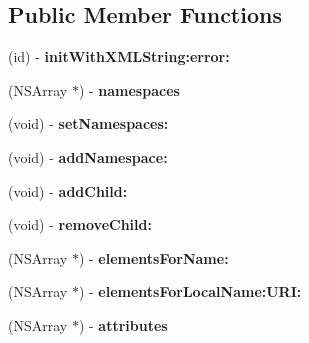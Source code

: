 \subsection*{Public Member Functions}
\begin{DoxyCompactItemize}
\item 
\hypertarget{interface_g_data_x_m_l_element_a8020a4dae6ad3175527534d5a793e285}{
(id) -\/ {\bfseries initWithXMLString:error:}}
\label{interface_g_data_x_m_l_element_a8020a4dae6ad3175527534d5a793e285}

\item 
\hypertarget{interface_g_data_x_m_l_element_a4c0f13082cdf1115dd51a1199a6c8935}{
(NSArray $\ast$) -\/ {\bfseries namespaces}}
\label{interface_g_data_x_m_l_element_a4c0f13082cdf1115dd51a1199a6c8935}

\item 
\hypertarget{interface_g_data_x_m_l_element_af725206ae3ce5c7855a1a2960e82fef7}{
(void) -\/ {\bfseries setNamespaces:}}
\label{interface_g_data_x_m_l_element_af725206ae3ce5c7855a1a2960e82fef7}

\item 
\hypertarget{interface_g_data_x_m_l_element_a58f2f9b4dbc512caa8b0a6ac42e907a1}{
(void) -\/ {\bfseries addNamespace:}}
\label{interface_g_data_x_m_l_element_a58f2f9b4dbc512caa8b0a6ac42e907a1}

\item 
\hypertarget{interface_g_data_x_m_l_element_a506a65646d411876d1d23b1ce0afa920}{
(void) -\/ {\bfseries addChild:}}
\label{interface_g_data_x_m_l_element_a506a65646d411876d1d23b1ce0afa920}

\item 
\hypertarget{interface_g_data_x_m_l_element_a8d9571efd0923ecc365b267fd1c95c8a}{
(void) -\/ {\bfseries removeChild:}}
\label{interface_g_data_x_m_l_element_a8d9571efd0923ecc365b267fd1c95c8a}

\item 
\hypertarget{interface_g_data_x_m_l_element_af0724908d7e1c6b831caddcaf7973aaa}{
(NSArray $\ast$) -\/ {\bfseries elementsForName:}}
\label{interface_g_data_x_m_l_element_af0724908d7e1c6b831caddcaf7973aaa}

\item 
\hypertarget{interface_g_data_x_m_l_element_af2cb81abe782d2d3396fe9abe3b9f60e}{
(NSArray $\ast$) -\/ {\bfseries elementsForLocalName:URI:}}
\label{interface_g_data_x_m_l_element_af2cb81abe782d2d3396fe9abe3b9f60e}

\item 
\hypertarget{interface_g_data_x_m_l_element_ae6e3e03eff00c20c2953fcbe88d3c4d5}{
(NSArray $\ast$) -\/ {\bfseries attributes}}
\label{interface_g_data_x_m_l_element_ae6e3e03eff00c20c2953fcbe88d3c4d5}


\end{DoxyCompactItemize}
